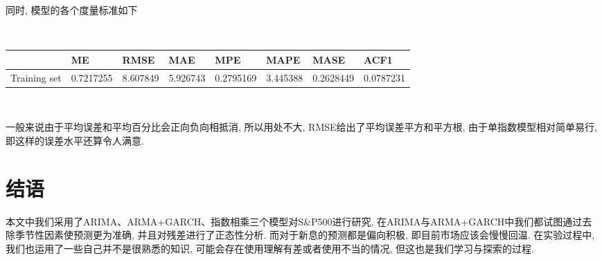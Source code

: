 \documentclass[11pt]{article}
\begin{document}
\vspace{-10pt}\qquad 同时, 模型的各个度量标准如下

\ 

\begin{center}
\begin{tabular}{r|lllllll}
  & ME & RMSE & MAE & MPE & MAPE & MASE & ACF1\\
\hline
	Training set & 0.7217255 & 8.607849 & 5.926743 & 0.2795169 & 3.445388 & 0.2628449 & 0.0787231\\
\end{tabular}
\normalsize
\end{center}

\ 

\qquad 一般来说由于平均误差和平均百分比会正向负向相抵消, 所以用处不大, RMSE给出了平均误差平方和平方根, 由于单指数模型相对简单易行, 即这样的误差水平还算令人满意. 
\section{结语}
\qquad 本文中我们采用了ARIMA、ARMA+GARCH、指数相乘三个模型对S\&P500进行研究, 在ARIMA与ARMA+GARCH中我们都试图通过去除季节性因素使预测更为准确, 并且对残差进行了正态性分析. 而对于新息的预测都是偏向积极, 即目前市场应该会慢慢回温. 在实验过程中, 我们也运用了一些自己并不是很熟悉的知识, 可能会存在使用理解有差或者使用不当的情况, 但这也是我们学习与探索的过程. 










































\newpage
\nocite{*}


\appendix
\end{document}
